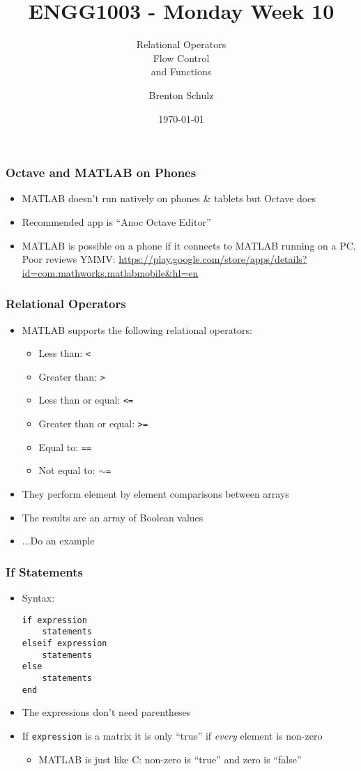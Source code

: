 \documentclass[14pt]{beamer}
\title{ENGG1003 - Monday Week 10}
\subtitle{Relational Operators\\Flow Control\\and Functions}
\author{Brenton Schulz}
\institute{University of Newcastle}
\date{\today}
\begin{document}
\titlepage

\begin{frame}
\frametitle{Octave and MATLAB on Phones}
\begin{itemize}
\item MATLAB doesn't run natively on phones \& tablets but Octave does
\item Recommended app is ``Anoc Octave Editor''
\item MATLAB is possible on a phone if it connects to MATLAB running on a PC. Poor reviews YMMV: \url{https://play.google.com/store/apps/details?id=com.mathworks.matlabmobile&hl=en}
\end{itemize}
\end{frame}

\begin{frame}
\frametitle{Relational Operators}
\begin{itemize}
\item MATLAB supports the following relational operators:
	\begin{itemize}
		\item Less than: \texttt{<}
		\item Greater than: \texttt{>}
		\item Less than or equal: \texttt{<=}
		\item Greater than or equal: \texttt{>=}
		\item Equal to: \texttt{==}
		\item Not equal to: \texttt{$\sim$=}
	\end{itemize}
\item They perform element by element comparisons between arrays
\item The results are an array of Boolean values
\item ...Do an example
\end{itemize}
\end{frame}

\begin{frame}[fragile]
\frametitle{If Statements}
\begin{itemize}
\item Syntax:
\begin{lstlisting}[style=pseudo]
if expression
    statements
elseif expression
    statements
else
    statements
end
\end{lstlisting}
\item The expressions don't need parentheses
\item If \texttt{expression} is a matrix it is only ``true'' if \textit{every} element is non-zero
	\begin{itemize}
		\item MATLAB is just like C: non-zero is ``true'' and zero is ``false''
	\end{itemize}
\end{itemize}
\end{frame}
\end{document}
